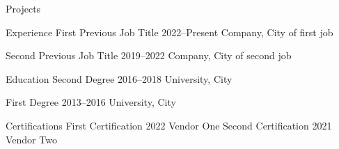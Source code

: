 \documentclass{cv}
\begin{document}
\begin{career}
{\begin{careersection}{Projects}
{\begin{careeritemdetails}
	\item \lipsum[8][1-2] 
	\item \lipsum[8][3-4]
	\item \lipsum[8][5-6]
        \end{careeritemdetails}
        }
    \end{careersection}
    }
    \columnbreak
    \begin{careersection}{Experience}
        \careeritem
        {First Previous Job Title}
        {2022--Present}
        {Company, City of first job}
        {
        \begin{careeritemdetails}	
	    \item \lipsum[9][1-2] 
	    \item \lipsum[9][3-4]
        \end{careeritemdetails}
        }
        \careeritem
        {Second Previous Job Title}
        {2019--2022}
        {Company, City of second job}
        {
        \begin{careeritemdetails}	
	    \item \lipsum[10][1-2] 
	    \item \lipsum[10][3-4]
        \end{careeritemdetails}
        }
    \end{careersection}
    \vfill
    \begin{careersection}{Education}
        \careeritem
        {Second Degree}
        {2016--2018}
        {University, City}
        {
        \begin{careeritemdetails}	
	    \item \lipsum[11][1-2]
        \end{careeritemdetails}
        }
        \careeritem
        {First Degree}
        {2013--2016}
        {University, City}
        {
        \begin{careeritemdetails}	
	    \item \lipsum[12][1-2]
        \end{careeritemdetails}
        }
    \end{careersection}
    \vfill
    \begin{careersection}{Certifications}
        \careeritem
	{First Certification}
        {2022}
        {Vendor One}
        {}
        \careeritem
	{Second Certification}
        {2021}
        {Vendor Two}
        {}
    \end{careersection}

\end{career}
\end{document}
